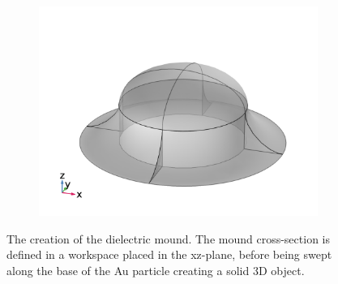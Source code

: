 \begin{figure}[htb!]
\begin{subfigure}{0.3\textwidth}
    \end{subfigure}
    \begin{subfigure}{0.3\textwidth}
        \centering
        \includegraphics[width=0.8\linewidth, trim=0cm 0 0 0cm, clip]{figures/ch4/implem/geometry/Sample5A_mound_mirror2.png}
    \end{subfigure}
    \caption{The creation of the dielectric mound. The mound cross-section is defined in a workspace placed in the xz-plane, before being swept along the base of the Au particle creating a solid 3D object.}
    \label{fig:implementation_geometry_mound}
\end{figure}

